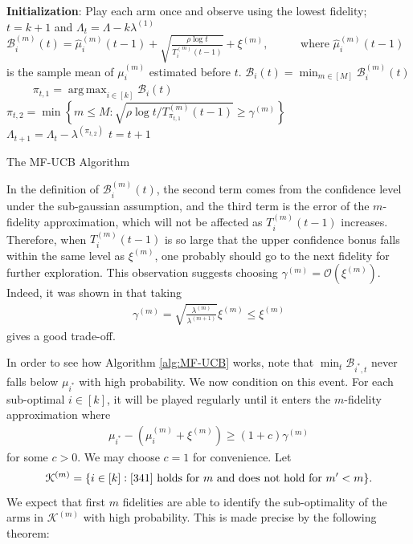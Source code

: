 \documentclass[letterpaper,11pt,openright,openany]{book}
\numberwithin{equation}{section}
\theoremstyle{plain}
\theoremstyle{definition}
\DeclareMathOperator*{\argmax}{arg\,max}
\begin{document}
\begin{algorithm}[H]
 \begin{algorithmic}[1]
 \STATE \textbf{Initialization}: Play each arm once and observe using the lowest fidelity; $t=k+1$ and $\Lambda_t = \Lambda - k\lambda^{(1)}$
 \STATE $\mathcal B_{i}^{(m)}(t) = \hat{\mu}^{(m)}_{i}(t-1)+\sqrt{\frac{\rho\log t}{T^{(m)}_{i}(t-1)}}+\xi^{(m)},$\ \ \ \ \  where $\hat{\mu}^{(m)}_{i}(t-1)$ is the sample mean of $\mu_{i}^{(m)}$ estimated before $t$. 
 \ENDFOR
 \STATE $\mathcal B_{i}(t) = \min_{m\in [M]}\mathcal B_{i}^{(m)}(t)$ \ \ \ \ 
 \ENDFOR
\STATE $\pi_{t,1} = \argmax_{i\in [k]}\mathcal B_{i}(t)$
\STATE $\pi_{t,2} = \min\left\{m\leq M: \sqrt{\rho\log t/T^{(m)}_{\pi_{t,1}}(t-1)}\geq\gamma^{(m)}\right\}$ \ \ \ \ \ \ 
\STATE $\Lambda_{t+1} = \Lambda_t - \lambda^{(\pi_{t,2})}$
\STATE $t = t+1$
\ENDWHILE
\end{algorithmic}
\caption{The MF-UCB Algorithm} 
\label{alg:MF-UCB}
\end{algorithm}

In the definition of $\mathcal B_{i}^{(m)}(t)$, the second term comes from the confidence level under the sub-gaussian assumption, and the third term is the error of the $m$-fidelity approximation, which will not be affected as $T^{(m)}_{i}(t-1)$ increases. Therefore, when $T^{(m)}_{i}(t-1)$ is so large that the upper confidence bonus falls within the same level as $\xi^{(m)}$, one probably should go to the next fidelity for further exploration. This observation suggests choosing $\gamma^{(m)}=\mathcal O(\xi^{(m)})$. Indeed, it was shown in \cite{kandasamy2016multi} that taking  
\begin{align*}
\gamma^{(m)} = \sqrt{\frac{\lambda^{(m)}}{\lambda^{(m+1)}}}\xi^{(m)}\leq\xi^{(m)}
\end{align*}
gives a good trade-off. 

In order to see how Algorithm \ref{alg:MF-UCB} works, note that $\min_{t}\mathcal B_{i^*,t}$ never falls below $\mu_{i^*}$ with high probability. We now condition on this event. For each sub-optimal $i\in [k]$, it will be played regularly until it enters the $m$-fidelity approximation where 
\begin{align}
\mu_{i^*}-(\mu^{(m)}_i+\xi^{(m)})\geq  (1+c)\gamma^{(m)}\label{341}
\end{align}
for some $c>0$. We may choose $c=1$ for convenience. 
Let $$\mathcal K^{(m)}=\{i\in [k]: \text{\eqref{341} holds for $m$ and does not hold for $m'<m$}\}.$$
We expect that first $m$ fidelities are able to identify the sub-optimality of the arms in $\mathcal K^{(m)}$ with high probability. This is made precise by the following theorem:
\end{document}
